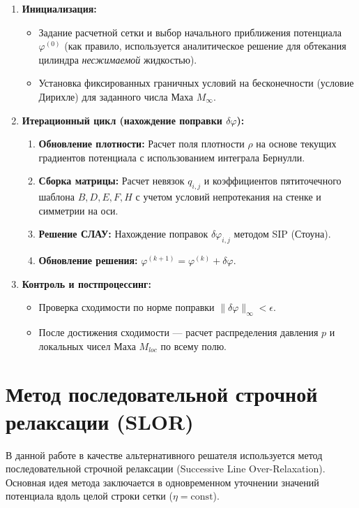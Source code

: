 \documentclass[a4paper,12pt]{article}
\begin{document}
	\begin{enumerate}
		\item \textbf{Инициализация:}
		\begin{itemize}
			\item Задание расчетной сетки и выбор начального приближения потенциала $\varphi^{(0)}$ (как правило, используется аналитическое решение для обтекания цилиндра \textit{несжимаемой} жидкостью).
			\item Установка фиксированных граничных условий на бесконечности (условие Дирихле) для заданного числа Маха $M_\infty$.
		\end{itemize}
		
		\item \textbf{Итерационный цикл (нахождение поправки $\delta\varphi$):}
		\begin{enumerate}
			\item \textbf{Обновление плотности:} Расчет поля плотности $\rho$ на основе текущих градиентов потенциала с использованием интеграла Бернулли.
			\item \textbf{Сборка матрицы:} Расчет невязок $q_{i,j}$ и коэффициентов пятиточечного шаблона $B, D, E, F, H$ с учетом условий непротекания на стенке и симметрии на оси.
			\item \textbf{Решение СЛАУ:} Нахождение поправок $\delta\varphi_{i,j}$ методом SIP (Стоуна).
			\item \textbf{Обновление решения:} $\varphi^{(k+1)} = \varphi^{(k)} + \delta \varphi$.
		\end{enumerate}
		
		\item \textbf{Контроль и постпроцессинг:}
		\begin{itemize}
			\item Проверка сходимости по норме поправки $\|\delta \varphi\|_\infty < \epsilon$.
			\item После достижения сходимости — расчет распределения давления $p$ и локальных чисел Маха $M_{loc}$ по всему полю.
		\end{itemize}
	\end{enumerate}



	\section{Метод последовательной строчной релаксации (SLOR)}

	В данной работе в качестве альтернативного решателя используется метод последовательной строчной релаксации (Successive Line Over-Relaxation). Основная идея метода заключается в одновременном уточнении значений потенциала вдоль целой строки сетки ($\eta = \text{const}$). 
\end{document}
